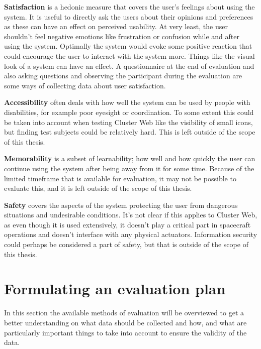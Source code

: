 \textbf{Satisfaction} is a hedonic measure that covers the user's feelings about using the system. It is useful to directly ask the users about their opinions and preferences as these can have an effect on perceived usability. At very least, the user shouldn't feel negative emotions like frustration or confusion while and after using the system. Optimally the system would evoke some positive reaction that could encourage the user to interact with the system more. Things like the visual look of a system can have an effect. A questionnaire at the end of evaluation and also asking questions and observing the participant during the evaluation are some ways of collecting data about user satisfaction.

\textbf{Accessibility} often deals with how well the system can be used by people with disabilities, for example poor eyesight or coordination. To some extent this could be taken into account when testing Cluster Web like the visibility of small icons, but finding test subjects could be relatively hard. This is left outside of the scope of this thesis.

\textbf{Memorability} is  a subset of learnability; how well and how quickly the user can continue using the system after being away from it for some time. Because of the limited timeframe that is available for evaluation, it may not be possible to evaluate this, and it is left outside of the scope of this thesis.

\textbf{Safety} covers the aspects of the system protecting the user from dangerous situations and undesirable conditions. It's not clear if this applies to Cluster Web, as even though it is used extensively, it doesn't play a critical part in spacecraft operations and doesn't interface with any physical actuators. Information security could perhaps be considered a part of safety, but that is outside of the scope of this thesis.

\cite{bevanevaluation, rubin2008handbook, albert2013measuring, laugwitz2008construction, hornbaek2006current}

\section{Formulating an evaluation plan}
In this section the available methods of evaluation will be overviewed to get a better understanding on what data should be collected and how, and what are particularly important things to take into account to ensure the validity of the data.

